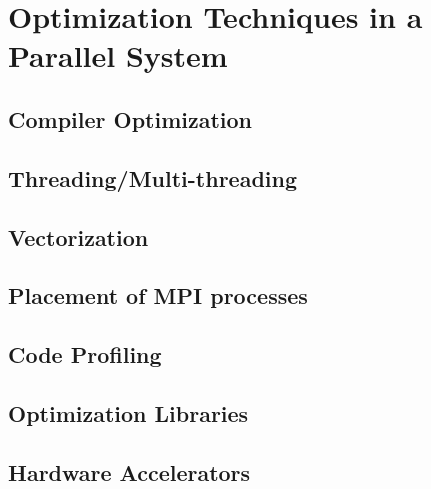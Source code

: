\chapter{Optimization Techniques in a Parallel System} \label{optimization}

\section{Compiler Optimization}
\section{Threading/Multi-threading}
\section{Vectorization}
\section{Placement of MPI processes}
\section{Code Profiling}
\section{Optimization Libraries}
\section{Hardware Accelerators}





